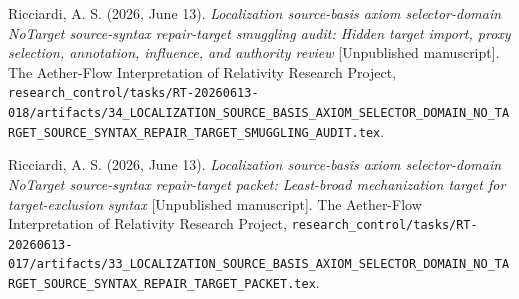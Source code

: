 \documentclass[11pt]{article}
\begin{document}
Ricciardi, A. S. (2026, June 13). \emph{Localization source-basis axiom
selector-domain NoTarget source-syntax repair-target smuggling audit:
Hidden target import, proxy selection, annotation, influence, and authority
review} [Unpublished manuscript]. The Aether-Flow Interpretation of
Relativity Research Project,
\texttt{research\_control/tasks/RT-20260613-018/artifacts/34\_LOCALIZATION\_SOURCE\_BASIS\_AXIOM\_SELECTOR\_DOMAIN\_NO\_TARGET\_SOURCE\_SYNTAX\_REPAIR\_TARGET\_SMUGGLING\_AUDIT.tex}.

Ricciardi, A. S. (2026, June 13). \emph{Localization source-basis axiom
selector-domain NoTarget source-syntax repair-target packet: Least-broad
mechanization target for target-exclusion syntax} [Unpublished manuscript].
The Aether-Flow Interpretation of Relativity Research Project,
\texttt{research\_control/tasks/RT-20260613-017/artifacts/33\_LOCALIZATION\_SOURCE\_BASIS\_AXIOM\_SELECTOR\_DOMAIN\_NO\_TARGET\_SOURCE\_SYNTAX\_REPAIR\_TARGET\_PACKET.tex}.
\end{document}
